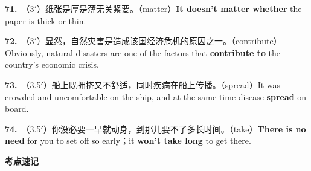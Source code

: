 \documentclass[10pt,a4paper]{article}
\newcommand{\A}[1]{\textbf{#1}}
\newcommand{\ans}[3]{\noindent\textbf{#1.}~{\footnotesize（#2）}#3\par\vspace{0.42em}}
\begin{document}
\ans{71}{3$'$}{纸张是厚是薄无关紧要。（matter）\newline\hspace{1.2em}\A{It doesn't matter whether} the paper is thick or thin.\newline\hspace{1.2em}{\footnotesize 亦可：Whether the paper is thick or thin doesn't matter.}}
\ans{72}{3$'$}{显然，自然灾害是造成该国经济危机的原因之一。（contribute）\newline\hspace{1.2em}Obviously, natural disasters are one of the factors that \A{contribute to} the country's economic crisis.\newline\hspace{1.2em}{\footnotesize 亦可：Obviously, natural disasters contribute to the country's economic crisis.}}
\ans{73}{3.5$'$}{船上既拥挤又不舒适，同时疾病在船上传播。（spread）\newline\hspace{1.2em}It was crowded and uncomfortable on the ship, and at the same time disease \A{spread} on board.\newline\hspace{1.2em}{\footnotesize 亦可：On board the ship, it was crowded and uncomfortable, and diseases spread.}}
\ans{74}{3.5$'$}{你没必要一早就动身，到那儿要不了多长时间。（take）\newline\hspace{1.2em}\A{There is no need} for you to set off so early；it \A{won't take long} to get there.\newline\hspace{1.2em}{\footnotesize 亦可：You don't have to set off so early—it won't take you long to get there.}}

\vspace{0.25em}
\noindent{\color{rulegray}\rule{\textwidth}{0.5pt}}
\vspace{0.35em}
\noindent\textbf{考点速记}
\vspace{0.25em}
\end{document}
